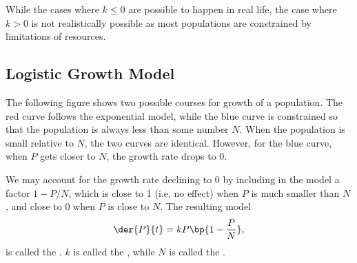 While the cases where $k \leq 0$ are possible to happen in real life, the case where $k > 0$ is not realistically possible as most populations are constrained by limitations of resources.

\subsection{Logistic Growth Model}

The following figure shows two possible courses for growth of a population. The red curve follows the exponential model, while the blue curve is constrained so that the population is always less than some number $N$. When the population is small relative to $N$, the two curves are identical. However, for the blue curve, when $P$ gets closer to $N$, the growth rate drops to 0.

\begin{figure}[H]
    \centering
    \caption{}
\end{figure}

We may account for the growth rate declining to 0 by including in the model a factor $1 - P/N$, which is close to 1 (i.e. no effect) when $P$ is much smaller than $N$, and close to 0 when $P$ is close to $N$. The resulting model \[\der{P}{t} = kP\bp{1 - \frac{P}{N}},\] is called the . $k$ is called the , while $N$ is called the .

